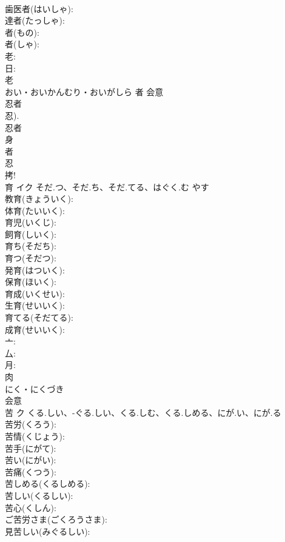 \documentclass[8pt]{extreport}
\begin{document}
\begin{CJK}{UTF8}{min}
\\	歯医者(はいしゃ): 
\\	達者(たっしゃ): 
\\	者(もの): 
\\	者(しゃ): 
\\	老: 
\\	日: 
\\	老	
\\	おい・おいかんむり・おいがしら	者	会意 
\\	忍者 
\\	忍). 
\\	忍者 
\\	身 
\\	者 
\\	忍 
\\	拷!	
\\	育	イク	そだ.つ、そだ.ち、そだ.てる、はぐく.む	やす	
\\	教育(きょういく): 
\\	体育(たいいく): 
\\	育児(いくじ): 
\\	飼育(しいく): 
\\	育ち(そだち): 
\\	育つ(そだつ): 
\\	発育(はついく): 
\\	保育(ほいく): 
\\	育成(いくせい): 
\\	生育(せいいく): 
\\	育てる(そだてる): 
\\	成育(せいいく): 
\\	亠: 
\\	厶: 
\\	月: 
\\	肉	
\\	にく・にくづき	
\\	会意 
\\	苦	ク	くる.しい、-ぐる.しい、くる.しむ、くる.しめる、にが.い、にが.る		
\\	苦労(くろう): 
\\	苦情(くじょう): 
\\	苦手(にがて): 
\\	苦い(にがい): 
\\	苦痛(くつう): 
\\	苦しめる(くるしめる): 
\\	苦しい(くるしい): 
\\	苦心(くしん): 
\\	ご苦労さま(ごくろうさま): 
\\	見苦しい(みぐるしい): 

\end{CJK}
\end{document}

